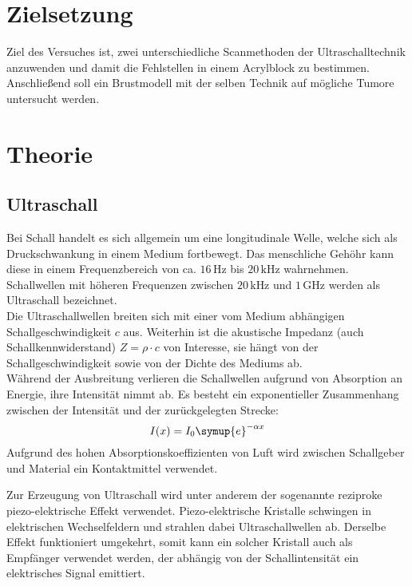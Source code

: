 \section{Zielsetzung}
Ziel des Versuches ist, zwei unterschiedliche Scanmethoden der Ultraschalltechnik anzuwenden
und damit die Fehlstellen in einem Acrylblock zu bestimmen.
Anschließend soll ein Brustmodell mit der selben Technik auf mögliche Tumore untersucht werden.

\section{Theorie}
\label{sec:Theorie}

\subsection{Ultraschall}
\label{sec:Ultraschall}

Bei Schall handelt es sich allgemein um eine longitudinale Welle, welche sich als Druckschwankung
in einem Medium fortbewegt.
Das menschliche Gehöhr kann diese in einem Frequenzbereich von ca. $16\,\unit{\hertz}$ bis $20\,\unit{\kilo\hertz}$
wahrnehmen. Schallwellen mit höheren Frequenzen zwischen $20\,\unit{\kilo\hertz}$ und $1\,\unit{\giga\hertz}$ werden als
Ultraschall bezeichnet. \\
Die Ultraschallwellen breiten sich mit einer vom Medium abhängigen Schallgeschwindigkeit $c$ aus.
Weiterhin ist die akustische Impedanz (auch Schallkennwiderstand) $Z=\rho \cdot c$ von Interesse, sie hängt
von der Schallgeschwindigkeit sowie von der Dichte des Mediums ab. \\
Während der Ausbreitung verlieren die Schallwellen aufgrund von Absorption an Energie, ihre Intensität nimmt ab.
Es besteht ein exponentieller Zusammenhang zwischen der Intensität und der zurückgelegten Strecke:
\begin{equation}
    \label{eq:Dämpfung}
    I(x)=I_{0}\symup{e}^{-\alpha x}
\end{equation}
Aufgrund des hohen Absorptionskoeffizienten von Luft wird zwischen Schallgeber und Material ein Kontaktmittel verwendet.

Zur Erzeugung von Ultraschall wird unter anderem der sogenannte reziproke piezo-elektrische Effekt verwendet.
Piezo-elektrische Kristalle schwingen in elektrischen Wechselfeldern und strahlen dabei Ultraschallwellen ab.
Derselbe Effekt funktioniert umgekehrt, somit kann ein solcher Kristall auch als Empfänger verwendet werden,
der abhängig von der Schallintensität ein elektrisches Signal emittiert.

